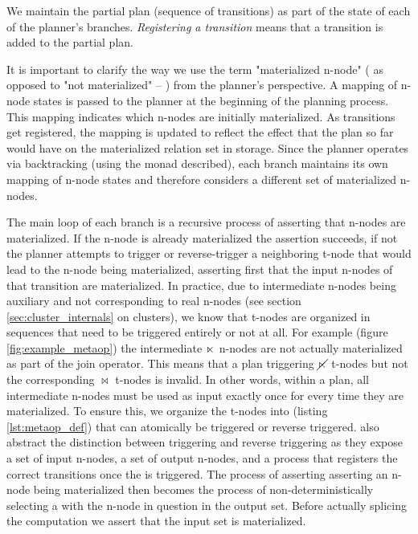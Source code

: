 We maintain the partial plan (sequence of transitions) as part of the
state of each of the planner's branches. \emph{Registering a
  transition} means that a transition is added to the partial plan.

It is important to clarify the way we use the term "materialized n-node"
( as opposed to "not materialized" -- ) from the planner's
perspective. A mapping of n-node states is passed to the planner at the
beginning of the planning process. This mapping indicates which n-nodes
are initially materialized. As transitions get registered,
the mapping is updated to reflect the effect that the plan so far
would have on the materialized relation set in storage. Since the
planner operates via backtracking (using the  monad described),
each branch maintains its own mapping of n-node states and therefore
considers a different set of materialized n-nodes.



The main loop of each branch is a recursive process of asserting that
n-nodes are materialized. If the n-node is already materialized the
assertion succeeds, if not the planner attempts to trigger or reverse-trigger
a neighboring t-node that would lead to the n-node being
materialized, asserting first that the input n-nodes of that transition
are materialized. In practice, due to intermediate n-nodes being
auxiliary and not corresponding to real n-nodes (see section
\ref{sec:cluster_internals} on clusters), we know that t-nodes are
organized in sequences that need to be triggered entirely or not at
all. For example (figure \ref{fig:example_metaop}) the intermediate
\(\ltimes\) n-nodes are not actually materialized as part of the join
operator. This means that a plan triggering \(\cancel\ltimes\) t-nodes but
not the corresponding \(\Join\) t-nodes is invalid. In other words,
within a plan, all intermediate n-nodes must be used as input exactly
once for every time they are materialized. To ensure this, we organize
the t-nodes into  (listing \ref{lst:metaop_def}) that
can atomically be triggered or reverse triggered.  also
abstract the distinction between triggering and reverse triggering as
they expose a set of input n-nodes, a set of output n-nodes, and a process that
registers the correct transitions once the  is
triggered. The process of asserting asserting an n-node being
materialized then becomes the process of non-deterministically
selecting a  with the n-node in question in the output
set. Before actually splicing the  computation we assert
that the input set is materialized.


